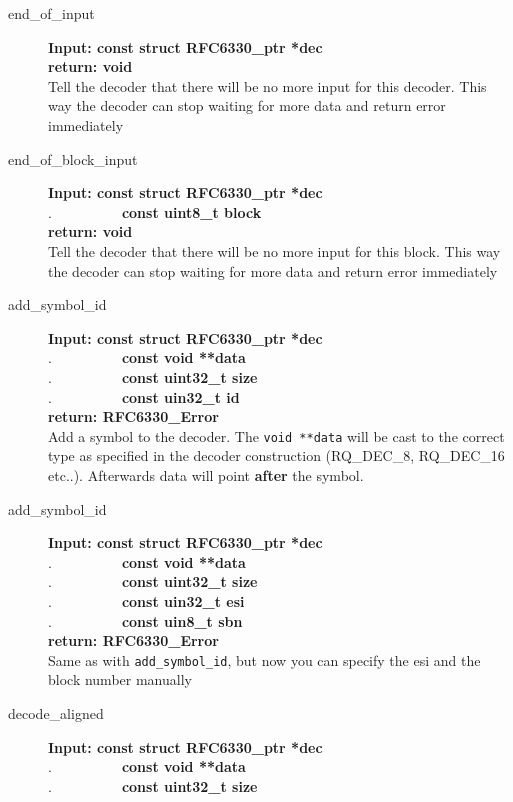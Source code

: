 \documentclass[11pt,a4paper]{refart}
\begin{document}
\begin{description}
\item[end\_of\_input]\textbf{Input: const struct RFC6330\_ptr *dec}\\
\textbf{return: void}\\
Tell the decoder that there will be no more input for this decoder. This way the decoder can stop waiting for more data and return error immediately
\item[end\_of\_block\_input]\textbf{Input: const struct RFC6330\_ptr *dec}\\
.\ \ \ \ \ \ \ \ \ \ \textbf{const uint8\_t block}\\
\textbf{return: void}\\
Tell the decoder that there will be no more input for this block. This way the decoder can stop waiting for more data and return error immediately
\item[add\_symbol\_id]\textbf{Input: const struct RFC6330\_ptr *dec}\\
.\ \ \ \ \ \ \ \ \ \ \textbf{const void **data}\\
.\ \ \ \ \ \ \ \ \ \ \textbf{const uint32\_t size}\\
.\ \ \ \ \ \ \ \ \ \ \textbf{const uin32\_t id}\\
\textbf{return: RFC6330\_Error}\\
Add a symbol to the decoder. The \texttt{void **data} will be cast to the correct type as specified in the decoder construction (RQ\_DEC\_8, RQ\_DEC\_16 etc..). Afterwards data will point \textbf{after} the symbol.
\item[add\_symbol\_id]\textbf{Input: const struct RFC6330\_ptr *dec}\\
.\ \ \ \ \ \ \ \ \ \ \textbf{const void **data}\\
.\ \ \ \ \ \ \ \ \ \ \textbf{const uint32\_t size}\\
.\ \ \ \ \ \ \ \ \ \ \textbf{const uin32\_t esi}\\
.\ \ \ \ \ \ \ \ \ \ \textbf{const uin8\_t sbn}\\
\textbf{return: RFC6330\_Error}\\
Same as with \texttt{add\_symbol\_id}, but now you can specify the esi and the block number manually
\item[decode\_aligned]\textbf{Input: const struct RFC6330\_ptr *dec}\\
.\ \ \ \ \ \ \ \ \ \ \textbf{const void **data}\\
.\ \ \ \ \ \ \ \ \ \ \textbf{const uint32\_t size}\\

\end{description}
\end{document}
